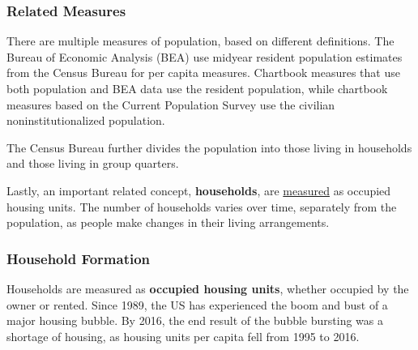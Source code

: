 \documentclass{report}
\begin{document}
{\begin{minipage}{0.76\textwidth}
\subsubsection*{Related Measures}
\small There are multiple measures of population, based on different definitions. The Bureau of Economic Analysis (BEA) use midyear resident population estimates from the Census Bureau for per capita measures. Chartbook measures that use both population and BEA data use the resident population, while chartbook measures based on the Current Population Survey use the civilian noninstitutionalized population. 

The Census Bureau further divides the population into those living in households and those living in group quarters.  

Lastly, an important related concept, \textbf{households}, are \href{https://www.census.gov/housing/hvs/index.html}{measured} as occupied housing units. The number of households varies over time, separately from the population, as people make changes in their living arrangements.  
\end{minipage}
\newpage
\begin{minipage}{0.76\textwidth}    
\subsubsection*{Household Formation}
\small Households are measured as \textbf{occupied housing units}, whether occupied by the owner or rented. Since 1989, the US has experienced the boom and bust of a major housing bubble. By 2016, the end result of the bubble bursting was a shortage of housing, as housing units per capita fell from 1995 to 2016. 
\vspace{1mm}
 

\end{minipage}}
\end{document}
